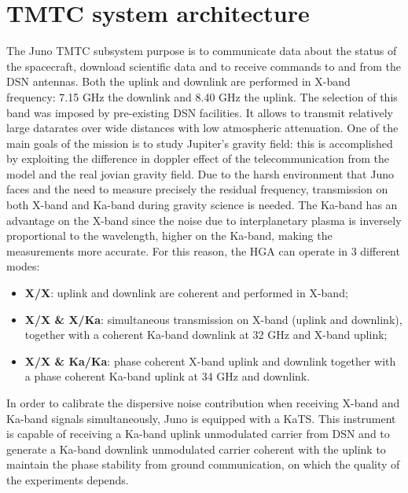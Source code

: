 \section{TMTC system architecture}
\label{sec:TMTC_architecture}


The Juno TMTC subsystem purpose is to communicate data about the status of the spacecraft, download scientific data and to receive commands to and from the DSN antennas. Both the uplink and downlink are performed in X-band frequency: 7.15 GHz the downlink and 8.40 GHz the uplink. The selection of this band was imposed by pre-existing DSN facilities. It allows to transmit relatively large datarates over wide distances with low atmospheric attenuation.
One of the main goals of the mission is to study Jupiter's gravity field: this is accomplished by exploiting the difference in doppler effect of the telecommunication from the model and the real jovian gravity field. Due to the harsh environment that Juno faces and the need to measure precisely the residual frequency, transmission on both X-band and Ka-band during gravity science is needed. The Ka-band has an advantage on the X-band since the noise due to interplanetary plasma is inversely proportional to the wavelength, higher on the Ka-band, making the measurements more accurate. 
For this reason, the HGA can operate in 3 different modes: 

\begin{itemize}
\item \textbf{X/X}: uplink and downlink are coherent and performed in X-band;
\item \textbf{X/X \& X/Ka}: simultaneous transmission on X-band (uplink and downlink), together with a coherent Ka-band downlink at 32 GHz and X-band uplink;
\item \textbf{X/X \& Ka/Ka}: phase coherent X-band uplink and downlink together with a phase coherent Ka-band uplink at 34 GHz and downlink.
\end{itemize}

In order to calibrate the dispersive noise contribution when receiving X-band and Ka-band signals simultaneously, Juno is equipped with a KaTS. This instrument is capable of receiving a Ka-band uplink unmodulated carrier from DSN and to generate a Ka-band downlink unmodulated carrier coherent with the uplink to maintain the phase stability from ground communication, on which the quality of the experiments depends\cite{juno_telecommunication}.

